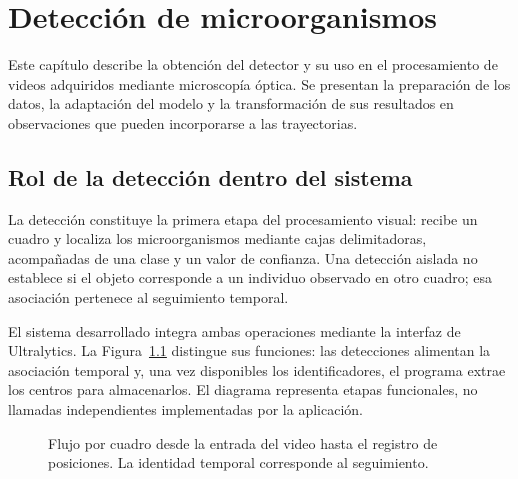 \chapter{Detección de microorganismos}
\label{chap:deteccion}

Este capítulo describe la obtención del detector y su uso en el procesamiento de videos adquiridos mediante microscopía óptica. Se presentan la preparación de los datos, la adaptación del modelo y la transformación de sus resultados en observaciones que pueden incorporarse a las trayectorias.

\section{Rol de la detección dentro del sistema}

La detección constituye la primera etapa del procesamiento visual: recibe un cuadro y localiza los microorganismos mediante cajas delimitadoras, acompañadas de una clase y un valor de confianza. Una detección aislada no establece si el objeto corresponde a un individuo observado en otro cuadro; esa asociación pertenece al seguimiento temporal.

El sistema desarrollado integra ambas operaciones mediante la interfaz de Ultralytics. La Figura~\ref{fig:flujo-deteccion} distingue sus funciones: las detecciones alimentan la asociación temporal y, una vez disponibles los identificadores, el programa extrae los centros para almacenarlos. El diagrama representa etapas funcionales, no llamadas independientes implementadas por la aplicación.

\begin{figure}[H]
  \centering
  \caption{Flujo por cuadro desde la entrada del video hasta el registro de posiciones. La identidad temporal corresponde al seguimiento.}
  \label{fig:flujo-deteccion}
\end{figure}

